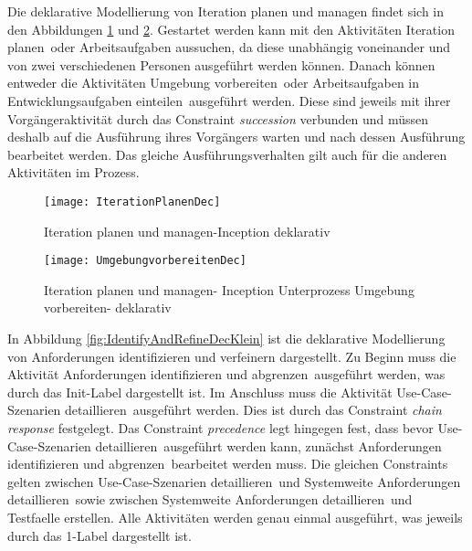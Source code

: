 Die deklarative Modellierung von Iteration planen und managen findet sich in den Abbildungen \ref{fig:IterationPlanenDec} und \ref{fig:UmgebungVorbereitenDec}. Gestartet werden kann mit den Aktivitäten \grqq Iteration planen\grqq \ oder \grqq Arbeitsaufgaben aussuchen\grqq, da diese unabhängig voneinander und von zwei verschiedenen Personen ausgeführt werden können.\newline
Danach können entweder die Aktivitäten \grqq Umgebung vorbereiten\grqq \ oder \grqq Arbeitsaufgaben in Entwicklungsaufgaben einteilen\grqq \ ausgeführt werden. Diese sind jeweils mit ihrer Vorgängeraktivität durch das Constraint \textit{succession} verbunden und müssen deshalb auf die Ausführung ihres Vorgängers warten und nach dessen Ausführung bearbeitet werden.\newline
Das gleiche Ausführungsverhalten gilt auch für die anderen Aktivitäten im Prozess. 



\begin{figure}[htp]
\begin{center}
  \texttt{[image: IterationPlanenDec]} %
  \caption{Iteration planen und managen-Inception deklarativ}
  \label{fig:IterationPlanenDec}
\end{center}
\end{figure}

\begin{figure}[htp]
\begin{center}
  \texttt{[image: UmgebungvorbereitenDec]} %
  \caption{Iteration planen und managen- Inception Unterprozess Umgebung vorbereiten- deklarativ}
  \label{fig:UmgebungVorbereitenDec}
\end{center}
\end{figure}


In Abbildung \ref{fig:IdentifyAndRefineDecKlein} ist die deklarative Modellierung von Anforderungen identifizieren und verfeinern dargestellt.\newline
Zu Beginn muss die Aktivität \grqq Anforderungen identifizieren und abgrenzen\grqq \ ausgeführt werden, was durch das Init-Label dargestellt ist. Im Anschluss muss die Aktivität \grqq Use-Case-Szenarien detaillieren\grqq \ ausgeführt werden. Dies ist durch das Constraint \textit{chain response} festgelegt. Das Constraint \textit{precedence} legt hingegen fest, dass bevor \grqq Use-Case-Szenarien detaillieren\grqq \ ausgeführt werden kann, zunächst \grqq Anforderungen identifizieren und abgrenzen\grqq \ bearbeitet werden muss. Die gleichen Constraints gelten zwischen \grqq Use-Case-Szenarien detaillieren\grqq \ und \grqq Systemweite Anforderungen detaillieren\grqq \ sowie zwischen \grqq Systemweite Anforderungen detaillieren\grqq \ und \grqq Testfaelle erstellen\grqq. Alle Aktivitäten werden genau einmal ausgeführt, was jeweils durch das 1-Label dargestellt ist. 

